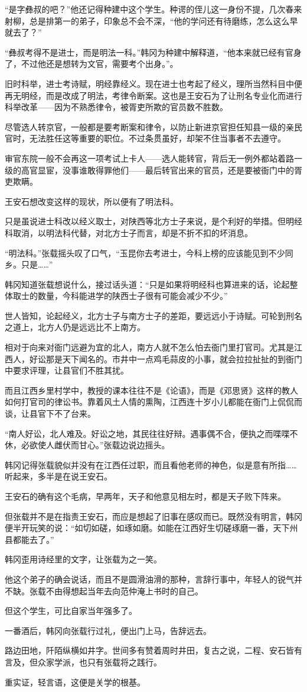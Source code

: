 “是字彝叔的吧？”他还记得种建中这个学生。种谔的侄儿这一身份不提，几次春来射柳，总是排第一的弟子，印象总不会不深，“他的学问还有待磨练，怎么这么早就去了？”

“彝叔考得不是进士，而是明法一科。”韩冈为种建中解释道，“他本来就已经有官身了，不过他还是想转为文官，需要考个出身。”。

旧时科举，进士考诗赋，明经靠经义。现在进士也考起了经义，理所当然科目中便再无明经，而是改成了明法，考律令断案。这也是王安石为了让刑名专业化而进行科举改革——因为不熟悉律令，被胥吏所欺的官员数不胜数。

尽管选人转京官，一般都是要考断案和律令，以防止新进京官担任知县一级的亲民官时，无法胜任这等重要的职位。不过条贯虽好，却架不住当事者不去遵守。

审官东院一般不会再这一项考试上卡人——选人能转官，背后无一例外都站着路一级的高官显宦，没事谁敢得罪他们——最后转官出来的官员，还是要被衙门中的胥吏欺瞒。

王安石想改变这样的现状，所以便有了明法科。

只是虽说进士科改以经义取士，对陕西等北方士子来说，是个利好的举措。但明经科取消，以明法科代替，对北方士子而言，却是不折不扣的坏消息。

“明法科。”张载摇头叹了口气，“玉昆你去考进士，今科上榜的应该能见到不少同乡。只是……”

韩冈知道张载想说什么，接过话头道：“只是如果将明经科也算进来的话，论起整体取士的数量，今科能进学的陕西士子很有可能会减少不少。”

世人皆知，论起经义，北方士子与南方士子的差距，要远远小于诗赋。可轮到刑名之道上，北方人仍是远远比不上南方。

相对于向来对衙门远避为宜的北人，南方人就不怎么怕去衙门里打官司。尤其是江西人，好讼那是天下闻名的。市井中一点鸡毛蒜皮的小事，就会拉拉扯扯的到衙门中要求评理，让县官们不胜其扰。

而且江西乡里村学中，教授的课本往往不是《论语》，而是《邓思贤》这样的教人如何打官司的律讼书。靠着风土人情的熏陶，江西连十岁小儿都能在衙门上侃侃而谈，让县官下不了台来。

“南人好讼，北人难及。好讼之地，其民往往好辩。遇事偶不合，便执之而喋喋不休，必欲使人雌伏而甘心。”张载边说边摇头。

韩冈记得张载貌似并没有在江西任过职，而且看他老师的神色，似是意有所指……听起来，多半是在说王安石。

王安石的确有这个毛病，早两年，天子和他意见相左时，都是天子败下阵来。

但张载并不是在指责王安石，而应是想起了旧事在感叹而已。既然没有明言，韩冈便半开玩笑的说：“如切如磋，如琢如磨。如能在江西好生切磋琢磨一番，天下州县都能去了。”

韩冈歪用诗经里的文字，让张载为之一笑。

他这个弟子的确会说话，而且不是圆滑油滑的那种，言辞行事中，年轻人的锐气并不缺。张载不由得想起当年去向范仲淹上书时的自己。

但这个学生，可比自家当年强多了。

一番酒后，韩冈向张载行过礼，便出门上马，告辞远去。

路边田地，阡陌纵横如井字。世间多有赞着周时井田，复古之说，二程、安石皆有言及，但众家学派，也只有张载将之践行。

重实证，轻言语，这便是关学的根基。

